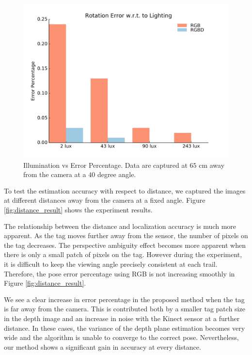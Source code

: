 \begin{figure}
\centering
\includegraphics[width=\columnwidth]{figs/lighting_fig1}
\caption{Illumination vs Error Percentage. Data are captured at $65$ cm away from the camera at a $40$ degree angle.}
\label{fig:lighting_result}
\end{figure}

To test the estimation accuracy with respect to distance, we captured the images at different distances away from the camera at a fixed angle. Figure \ref{fig:distance_result} shows the experiment results.

The relationship between the distance and localization accuracy is much more apparent. As the tag moves further away from the sensor, the number of pixels on the tag decreases. The perspective ambiguity effect becomes more apparent when there is only a small patch of pixels on the tag. However during the experiment, it is difficult to keep the viewing angle precisely consistent at each trail. Therefore, the pose error percentage using RGB is not increasing smoothly in Figure \ref{fig:distance_result}.

We see a clear increase in error percentage in the proposed method when the tag is far away from the camera. This is contributed both by a smaller tag patch size in the depth image and an increase in noise with the Kinect sensor at a further distance. In these cases, the variance of the depth plane estimation becomes very wide and the algorithm is unable to converge to the correct pose. Nevertheless, our method shows a significant gain in accuracy at every distance.

